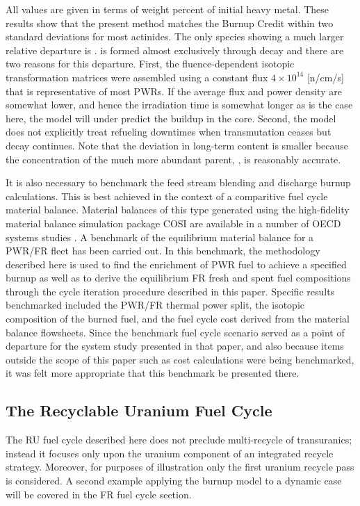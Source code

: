 All values are given in terms of weight percent of initial heavy metal.    These results show that 
the present method matches the Burnup Credit within two standard deviations for most actinides.  
The only species showing a much larger relative departure is .   is formed 
almost exclusively through  decay and there are two reasons for this departure.  First, the 
fluence-dependent isotopic transformation matrices were assembled using a constant flux $4\times10^{14}$ 
[n/cm/s] that is representative of most PWRs.  If the average flux and power density are somewhat lower, 
and hence the irradiation time is somewhat longer as is the case here, the model will under predict the 
 buildup in the core.   Second, the model does not explicitly treat refueling downtimes 
when transmutation ceases but decay continues. Note that the deviation in long-term  content 
is smaller because the concentration of the much more abundant parent, , is reasonably accurate. 

It is also necessary to benchmark the feed stream blending and discharge burnup calculations.  This is best 
achieved in the context of a comparitive fuel cycle material balance.  Material balances of this type 
generated using the high-fidelity material balance simulation package COSI \cite{Boucher2006} are 
available in a number 
of OECD systems studies \cite{OECD2002}.  A benchmark of the equilibrium material balance for a PWR/FR fleet 
has been carried out.  In this benchmark, the methodology described here is used to find the enrichment 
of PWR fuel to achieve a specified burnup as well as to derive the equilibrium FR fresh and spent fuel 
compositions through the cycle iteration procedure described in this paper.  Specific results benchmarked 
included the PWR/FR thermal power split, the isotopic composition of the burned fuel, and the fuel cycle 
cost derived from the material balance flowsheets.  Since the benchmark fuel cycle 
scenario served as a point of departure for the system study presented in that paper, and also because 
items outside the scope of this paper such as cost calculations were being benchmarked, it was felt 
more appropriate that this benchmark be presented there.





\subsection{The Recyclable Uranium Fuel Cycle}
\label{1g_sec:RUFC}
The RU fuel cycle described here does not preclude multi-recycle of transuranics; instead it 
focuses only upon the uranium component of an integrated recycle strategy.  Moreover, for 
purposes of illustration only the first uranium recycle pass is considered.  A second example 
applying the burnup model to a dynamic case will be covered in the FR fuel cycle section.

